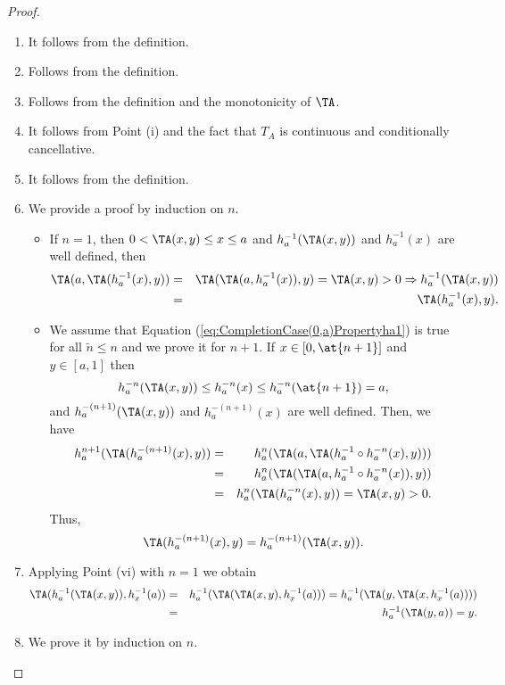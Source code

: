 \begin{proof}
	\begin{enumerate}[label=(\roman*)]
		\item It follows from the definition.
		\item Follows from the definition.
		\item Follows from the definition and the monotonicity of $\TA$.
		\item It follows from Point (i) and the fact that $T_A$ is continuous and conditionally cancellative.
		\item It follows from the definition.
		\item We provide a proof by induction on $n$.
		\begin{itemize}
			\item If $n=1$, then $0<\TA(x,y) \leq x \leq a$ and $h_a^{-1}(\TA(x,y))$ and $h_a^{-1}(x)$ are well defined, then
			\begin{eqnarray*}
			\TA(a,\TA(h_a^{-1}(x),y)) &=& \TA(\TA(a,h_a^{-1}(x)),y)=\TA(x,y)>0 \Rightarrow h_a^{-1}(\TA(x,y)) \\ &=&\TA(h_a^{-1}(x),y).
			\end{eqnarray*}
			\item We assume that Equation (\ref{eq:CompletionCase(0,a)Propertyha1}) is true for all $\tilde{n} \leq n$ and we prove it for $n+1$. If $x \in [0,\at{n+1}]$ and $y \in [a,1]$ then
			$$h_a^{-n}(\TA(x,y)) \leq h_a^{-n}(x) \leq h_a^{-n}(\at{n+1}) =a,$$
			and $h_a^{-(n+1)}(\TA(x,y))$ and $h_a^{-(n+1)}(x)$ are well defined. Then, we have
			\begin{eqnarray*}
				h_a^{n+1}(\TA(h_a^{-(n+1)}(x),y))&=&h_a^{n}(\TA(a,\TA(h_a^{-1} \circ h_a^{-n}(x),y))) \\
				&=& h_a^{n}(\TA(\TA(a,h_a^{-1} \circ h_a^{-n}(x)),y))\\
				&=&h_a^n(\TA(h_a^{-n}(x),y)) = \TA(x,y)>0.
			\end{eqnarray*}
			Thus,
			$$\TA(h_a^{-(n+1)}(x),y) = h_a^{-(n+1)}(\TA(x,y)).$$
		\end{itemize}
		\item Applying Point (vi) with $n=1$ we obtain
		\begin{eqnarray*}
			\TA(h_a^{-1}(\TA(x,y)),h_x^{-1}(a)) &=&h_a^{-1}(\TA(\TA(x,y),h_x^{-1}(a)))=h_a^{-1}(\TA(y,\TA(x,h_x^{-1}(a)))) \\
			&=&h_a^{-1}(\TA(y,a))=y.
		\end{eqnarray*}
		\item We prove it by induction on $n$.
		\begin{itemize}

\end{itemize}
\end{enumerate}
\end{proof}
